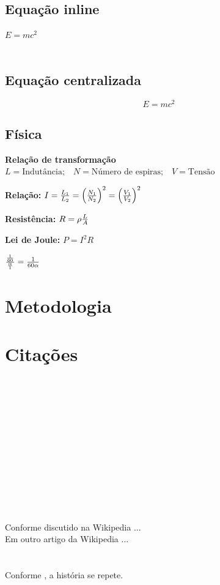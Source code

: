 \documentclass[12pt,a4paper,oneside,brazil]{abntex2}
\begin{document}
\section{Equação inline}
$E=mc^2$\\\\
\lipsum[12][1-33]
\section{Equação centralizada}
$$E=mc^2$$

\section{Física}
\textbf{Relação de transformação}
$L=\text{Indutância;}\quad N=\text{Número de espiras;}\quad V=\text{Tensão}$

\textbf{Relação:}
$I=\Large\frac{L_1}{L_2}\normalsize=\left( \Large\frac{N_1}{N_2} \right)^2\normalsize=\left(\Large\frac{V_1}{V_2} \right)^2$

\textbf{Resistência:}
$R=\rho\Large\frac{L}{A}$

\textbf{Lei de Joule:}
$P=I^2R$

$\Large\frac{\frac{1}{60}}{\frac{\alpha}{1}}\normalsize=\Large\frac{1}{60\alpha}$

\chapter{Metodologia}
\lipsum[8-9]

\chapter{Citações}
\cite{hawking1988}\\
\cite{feynman1963}\\
\cite{douglas2004}\\
\cite{knuth1997}\\
\cite{orwell1984}\\
\cite{einstein1935}\\
\cite{shannon1948}\\
\cite{latexWiki}\\
\cite{pythonOrg}\\
\cite{smith1992}\\
\\\\
Conforme discutido na Wikipedia \cite{luaWikipedia}...\\
Em outro artigo da Wikipedia \cite{terraWikipedia}...\\\\
\cite{exemploCincoAutores}\\
Conforme \cite{hi}, a história se repete.
\end{document}
